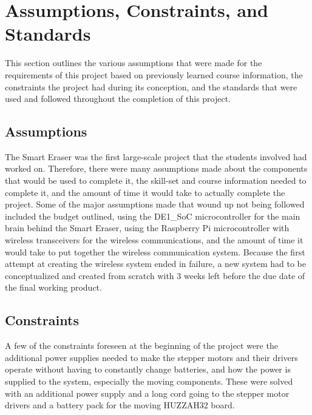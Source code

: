 \section{Assumptions, Constraints, and Standards}

This section outlines the various assumptions that were made for the requirements of this project based on previously learned course information, the constraints the project had during its conception, and the standards that were used and followed throughout the completion of this project.\par

\subsection{Assumptions}
The Smart Eraser was the first large-scale project that the students involved had worked on. Therefore, there were many assumptions made about the components that would be used to complete it, the skill-set and course information needed to complete it, and the amount of time it would take to actually complete the project. Some of the major assumptions made that wound up not being followed included the budget outlined, using the DE1\_SoC microcontroller for the main brain behind the Smart Eraser, using the Raspberry Pi microcontroller with wireless transceivers for the wireless communications, and the amount of time it would take to put together the wireless communication system. Because the first attempt at creating the wireless system ended in failure, a new system had to be conceptualized and created from scratch with 3 weeks left before the due date of the final working product.

\subsection{Constraints}
A few of the constraints foreseen at the beginning of the project were the additional power supplies needed to make the stepper motors and their drivers operate without having to constantly change batteries, and how the power is supplied to the system, especially the moving components. These were solved with an additional power supply and a long cord going to the stepper motor drivers and a battery pack for the moving HUZZAH32 board.

